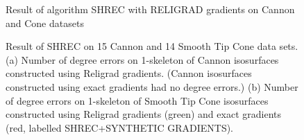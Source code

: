 \begin{figure}[t]
	\caption{Result of algorithm SHREC with RELIGRAD gradients on Cannon and Cone datasets}
	\label{fig:cannon_cone}
\end{figure}

\begin{figure}[t]

\caption{Result of SHREC on 15 Cannon and 14 Smooth Tip Cone data sets.
(a) Number of degree errors on 1-skeleton of Cannon isosurfaces
constructed using Religrad gradients.
(Cannon isosurfaces constructed using exact gradients had no degree errors.)
(b) Number of degree errors on 1-skeleton of Smooth Tip Cone isosurfaces
constructed using Religrad gradients (green) and exact gradients 
(red, labelled SHREC+SYNTHETIC GRADIENTS).}
\label{fig:cannon_cone_summary}
\end{figure}

